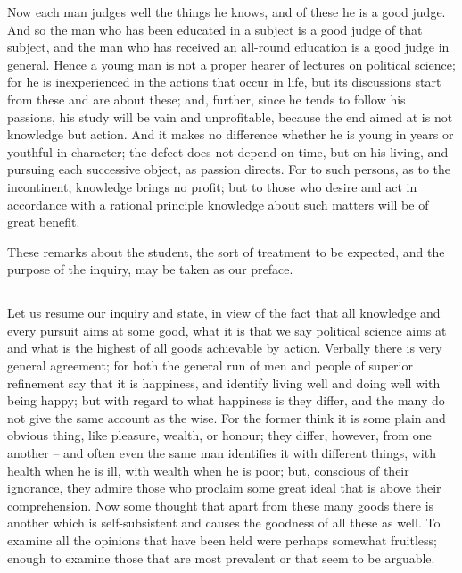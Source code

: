 \documentclass[12pt]{article}
\begin{document}
  Now each man judges well the things he knows, and of these he is a
good judge. And so the man who has been educated in a subject is a
good judge of that subject, and the man who has received an
all-round education is a good judge in general. Hence a young man is
not a proper hearer of lectures on political science; for he is
inexperienced in the actions that occur in life, but its discussions
start from these and are about these; and, further, since he tends
to follow his passions, his study will be vain and unprofitable,
because the end aimed at is not knowledge but action. And it makes
no difference whether he is young in years or youthful in character;
the defect does not depend on time, but on his living, and pursuing
each successive object, as passion directs. For to such persons, as to
the incontinent, knowledge brings no profit; but to those who desire
and act in accordance with a rational principle knowledge about such
matters will be of great benefit.

  These remarks about the student, the sort of treatment to be
expected, and the purpose of the inquiry, may be taken as our preface.

\subsection{}
  Let us resume our inquiry and state, in view of the fact that all
knowledge and every pursuit aims at some good, what it is that we
say political science aims at and what is the highest of all goods
achievable by action. Verbally there is very general agreement; for
both the general run of men and people of superior refinement say that
it is happiness, and identify living well and doing well with being
happy; but with regard to what happiness is they differ, and the
many do not give the same account as the wise. For the former think it
is some plain and obvious thing, like pleasure, wealth, or honour;
they differ, however, from one another -- and often even the same man
identifies it with different things, with health when he is ill,
with wealth when he is poor; but, conscious of their ignorance, they
admire those who proclaim some great ideal that is above their
comprehension. Now some thought that apart from these many goods there
is another which is self-subsistent and causes the goodness of all
these as well. To examine all the opinions that have been held were
perhaps somewhat fruitless; enough to examine those that are most
prevalent or that seem to be arguable.
\end{document}
